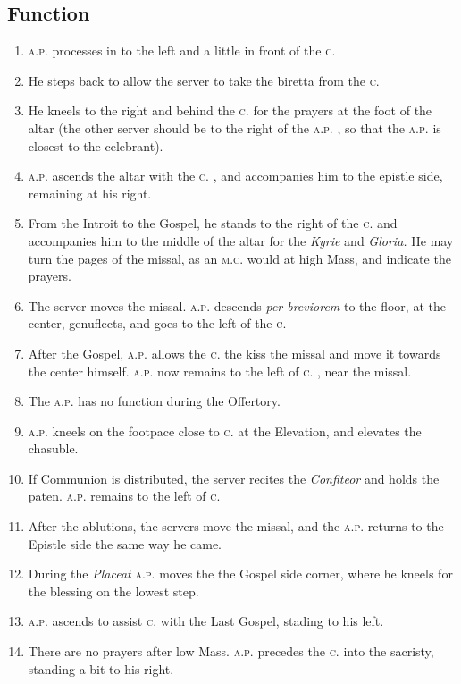 \documentclass[10pt,twocolumn]{article}
\newcommand{\ap}{
    \textsc{a.p.}
}
\newcommand{\ce}{
    \textsc{c.}
}
\newcommand{\mc}{
    \textsc{m.c.}
}
\begin{document}
\subsection*{Function}
\begin{enumerate}
    \item \ap processes in to the left and a little in front of the \ce
    \item He steps back to allow the server to take the biretta from the \ce
    \item He kneels to the right and behind the \ce for the prayers at the foot
        of the altar (the other server should be to the right of the \ap, so
        that the \ap is closest to the celebrant).
    \item \ap ascends the altar with the \ce, and accompanies him to the epistle
        side, remaining at his right.
    \item From the Introit to the Gospel, he stands to the right of the \ce and
        accompanies him to the middle of the altar for the \textit{Kyrie} and
        \textit{Gloria.} He may turn the pages of the missal, as an \mc would at
        high Mass, and indicate the prayers.
    \item The server moves the missal. \ap descends \textit{per breviorem} to
        the floor, at the center, genuflects, and goes to the left of the \ce
    \item After the Gospel, \ap allows the \ce the kiss the missal and move it
        towards the center himself. \ap now remains to the left of \ce, near the missal.
    \item The \ap has no function during the Offertory.
    \item \ap kneels on the footpace close to \ce at the Elevation, and elevates
        the chasuble.
    \item If Communion is distributed, the server recites the
        \textit{Confiteor} and holds the paten. \ap remains to the left of \ce
    \item After the ablutions, the servers move the missal, and the \ap returns
        to the Epistle side the same way he came.
    \item During the \textit{Placeat} \ap moves the the Gospel side corner,
        where he kneels for the blessing on the lowest step.
    \item \ap ascends to assist \ce with the Last Gospel, stading to his left.
    \item There are no prayers after low Mass. \ap precedes the \ce into the
        sacristy, standing a bit to his right.
\end{enumerate}
\end{document}
